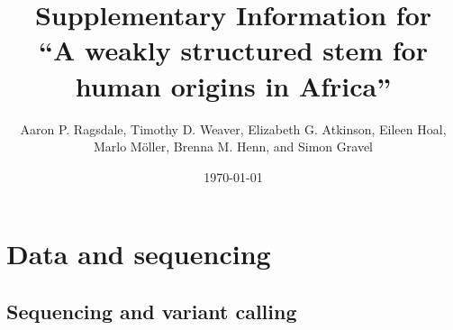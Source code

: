 \documentclass[]{article}
\begin{document}
\title{Supplementary Information for\\
``A weakly structured stem for human origins in Africa''}
\author{Aaron P. Ragsdale, Timothy D. Weaver, Elizabeth G. Atkinson, Eileen Hoal, Marlo M\"{o}ller, Brenna M. Henn, and Simon Gravel}
\date{\normalsize \today}
\maketitle

\renewcommand{\thefigure}{S\arabic{figure}}
\renewcommand{\thetable}{S\arabic{table}}
\renewcommand{\theequation}{S\arabic{equation}}
\setcounter{figure}{0}
\setcounter{table}{0}
\setcounter{equation}{0}

\small
\tableofcontents
\normalsize

\section{Data and sequencing}
\label{sec:data-sequencing}

\subsection{Sequencing and variant calling}
\end{document}
